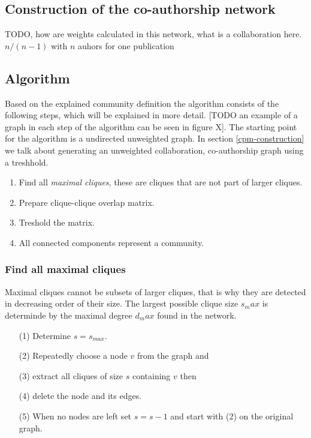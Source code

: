 \documentclass[runningheads,a4paper]{llncs}
\begin{document}
\subsection{Construction of the co-authorship network}
TODO, how are weights calculated in this network, what is a collaboration here. $n/(n-1)$ with $n$ auhors for one publication

\subsection{Algorithm}
Based on the explained community definition the algorithm consists of the following steps, which will be explained in more detail. [TODO an example of a graph in each step of the algorithm can be seen in figure X]. The starting point for the algorithm is a undirected unweighted graph. In section \ref{cpm-construction} we talk about generating an unweighted collaboration, co-authorship graph using a treshhold.

\begin{enumerate}
\item Find all \emph{maximal cliques}, these are cliques that are not part of larger cliques.
\item Prepare clique-clique overlap matrix.
\item Treshold the matrix.
\item All connected components represent a community.
\end{enumerate}

\subsubsection{Find all maximal cliques}
Maximal cliques cannot be subsets of larger cliques, that is why they are detected in decreasing order of their size. The largest possible clique size $s_max$ is determinde by the maximal degree $d_max$ found in the network.

\begin{enumerate}
\item[(1)] Determine $s=s_{max}$.
\item[(2)] Repeatedly choose a node $v$ from the graph and
\item[(3)] extract all cliques of size $s$ containing $v$ then
\item[(4)] delete the node and its edges.
\item[(5)] When no nodes are left set $s=s-1$ and start with (2) on the original graph.
\end{enumerate}
\end{document}
